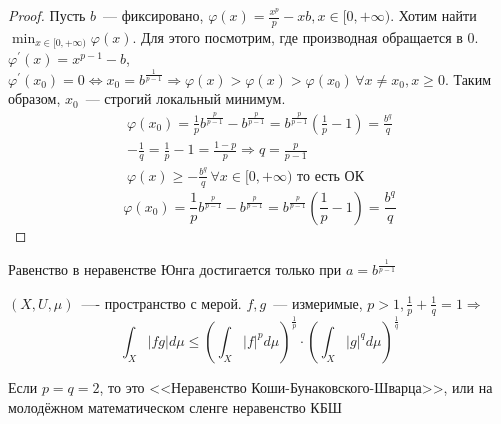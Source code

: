 \documentclass[document]{subfiles}
\begin{document}
\begin{proof}
    Пусть $b$~--- фиксировано, $\varphi(x) = \frac{x^p}{p} - xb, x \in [0, + \infty)$. Хотим найти $\min_{x \in [0, +\infty)} \varphi(x)$. Для этого посмотрим, где производная обращается в 0.
    $\varphi^\prime(x) = x^{p-1} - b$, $\varphi^\prime(x_0) = 0 \Leftrightarrow x_0 = b^{\frac{1}{p-1}} \Rightarrow \varphi(x) > \varphi(x) > \varphi(x_0) \, \forall x \ne x_0, x \geq 0$.
    Таким образом, $x_0$~--- строгий локальный минимум.
    \begin{gather*}
        \varphi(x_0) = \frac{1}{p} b^{\frac{p}{p-1}} - b^{\frac{p}{p-1}} = b^{\frac{p}{p-1}}\left( \frac{1}{p} -1 \right)  = \frac{b^q}{q}  \\
        -\frac{1}{q} = \frac{1}{p} - 1 = \frac{1-p}{p} \Rightarrow q = \frac{p}{p-1} \\
        \varphi(x) \geq - \frac{b^q}{q} \, \forall x \in [0, + \infty) \text { то есть ОК} 
    \end{gather*}
    \[ \varphi(x_0) = \frac{1}{p} b^{\frac{p}{p-1}} - b^{\frac{p}{p-1}} = b^{\frac{p}{p-1}}\left( \frac{1}{p} -1 \right)  = \frac{b^q}{q} \]
\end{proof}

\begin{remark}
    Равенство в неравенстве Юнга достигается только при $a = b^{\frac{1}{p-1}}$
\end{remark}

\begin{theorem}
    $(X, U, \mu)$~---- пространство с мерой. $f, g$~--- измеримые, $p > 1, \frac{1}{p} + \frac{1}{q} = 1 \Rightarrow$
    \[ \int_X |fg| d\mu \leq \left( \int_X |f|^p d\mu \right)^{\frac{1}{p}} \cdot \left( \int_X |g|^q d\mu \right)^{\frac{1}{q}} \tag{*} \]
\end{theorem}
Если $p=q=2$, то это <<Неравенство Коши-Бунаковского-Шварца>>, или на молодёжном математическом сленге неравенство КБШ 
\end{document}
